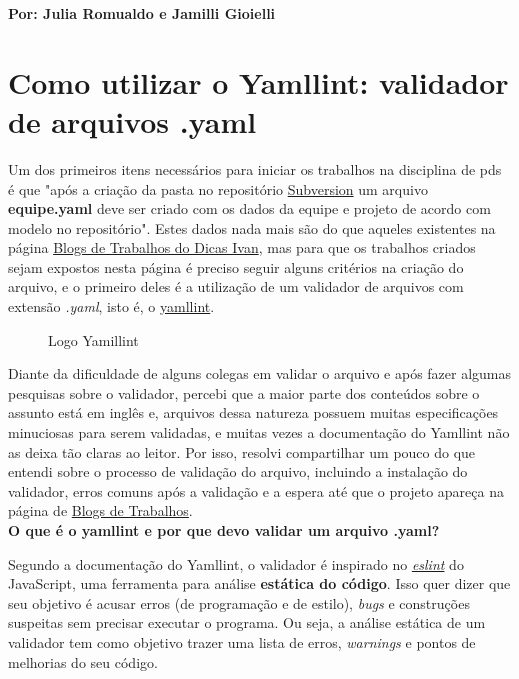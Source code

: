 \textbf{Por: Julia Romualdo e Jamilli Gioielli}

\section{Como utilizar o Yamllint: validador de arquivos .yaml}

Um dos primeiros itens necessários para iniciar os trabalhos na disciplina de \acs{pds} é  que "após a criação da pasta no repositório \href{https://dicas.ivanfm.com/programacao/scm/controle-de-versao/subversion.html}{Subversion} um arquivo \textbf{equipe.yaml} deve ser criado com os dados da equipe e projeto de acordo com modelo no repositório". Estes dados nada mais são do que aqueles existentes na página \href{https://dicas.ivanfm.com/aulas/blogs-de-trabalhos.html}{Blogs de Trabalhos do Dicas Ivan}, mas para que os trabalhos criados sejam expostos nesta página é preciso seguir alguns critérios na criação do arquivo, e o primeiro deles é a utilização de um validador de arquivos com extensão \textit{.yaml}, isto é, o \href{https://yamllint.readthedocs.io/en/stable/quickstart.html}{yamllint}.

\begin{figure}[htb]
\centering
\caption{\label{Yamillint} Logo Yamillint}

\end{figure}
\FloatBarrier

Diante da dificuldade de alguns colegas em validar o arquivo e após fazer algumas pesquisas sobre o validador, percebi que a maior parte dos conteúdos sobre o assunto está em inglês e, arquivos dessa natureza possuem muitas especificações minuciosas para serem validadas, e muitas vezes a documentação do \gls{Yamllint} não as deixa tão claras ao leitor. Por isso, resolvi compartilhar um pouco do que entendi sobre o processo de validação do arquivo, incluindo a instalação do validador, erros comuns após a validação e a espera até que o projeto apareça na página de \href{https://dicas.ivanfm.com/aulas/blogs-de-trabalhos.html}{Blogs de Trabalhos}.\\

\textbf{O que é o yamllint e por que devo validar um arquivo .yaml?}

Segundo a documentação do \gls{Yamllint}, o validador é inspirado no \textit{\href{https://eslint.org/}{eslint}} do JavaScript, uma ferramenta para análise \textbf{estática do código}. Isso quer dizer que seu objetivo é acusar erros (de programação e de estilo), \textit{bugs} e construções suspeitas sem precisar executar o programa. Ou seja, a análise estática de um validador tem como objetivo trazer uma lista de erros, \textit{warnings} e pontos de melhorias do seu código. 

